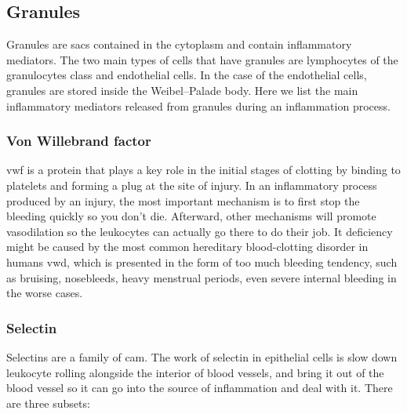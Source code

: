  

\subsection{Granules}
\label{inf:granules}

Granules are sacs contained in the cytoplasm and contain inflammatory mediators. The two main types of cells that have granules are lymphocytes of the granulocytes class and endothelial cells. In the case of the endothelial cells, granules are stored inside the Weibel–Palade body. Here we list the main inflammatory mediators released from granules during an inflammation process.

\subsubsection{Von Willebrand factor}
\label{in:VonWill}

\gls{vwf} is a protein that plays a key role in the initial stages of clotting by binding to platelets and forming a plug at the site of injury. In an inflammatory process produced by an injury, the most important mechanism is to first stop the bleeding quickly so you don't die. Afterward, other mechanisms will promote vasodilation so the leukocytes can actually go there to do their job. It deficiency might be caused by the most common hereditary blood-clotting disorder in humans \gls{vwd}, which is presented in the form of too much bleeding tendency, such as bruising, nosebleeds, heavy menstrual periods, even severe internal bleeding in the worse cases.

\subsubsection{Selectin}
\label{in:selectin}

Selectins are a family of \gls{cam}. The work of selectin in epithelial cells is slow down leukocyte rolling alongside the interior of blood vessels, and bring it out of the blood vessel so it can go into the source of inflammation and deal with it. There are three subsets:

